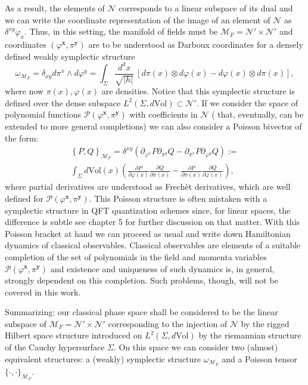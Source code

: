 \documentclass[12pt]{article}%
\begin{document}
As a result, the elements of $\mathcal{N}$ corresponds to a linear subspace of its dual and we can write the coordinate representation of the image of an element of $\mathcal{N}$ as $\delta^{xy}\varphi_x$. Thus, in this setting, the manifold of fields must  be $\mathcal{M}_F=\mathcal{N}'\times \mathcal{N}'$ and coordinates $(\varphi^\mathbf{x},\pi^\mathbf{y})$ are to be understood as Darboux coordinates for a densely defined weakly symplectic structure
\begin{equation}
\label{eq:symplecticFormlifted}
\omega_{\mathcal{M}_F}=\delta_{xy} d\pi^x \wedge d\varphi^y =\int_\Sigma \frac{d^dx}{\sqrt{\lvert h\rvert}}\ [d\pi(x)\otimes d\varphi(x)-d\varphi(x)\otimes d\pi(x)],
\end{equation}
where now $\pi(x),\varphi(x)$ are densities. Notice that this symplectic structure is defined over the dense subspace $L^2(\Sigma,d\textrm{Vol})\subset \mathcal{N}'$. If we consider the space of polynomial functions  $\mathcal{P}(\varphi^\mathbf{x},\pi^\mathbf{y})$ with coefficients in $\mathcal{N}$ ( that, eventually, can be  extended to more general completions) we can also consider a Poisson bivector of the form:
\begin{multline}
\label{eq:poissonbracket}
\left\{P,Q\right\}_{\mathcal{M}_F}=
\delta^{xy}\left( \partial_{\varphi^x}P\partial_{\pi^y}Q-\partial_{\pi^x}P\partial_{\varphi^y}Q \right):=\\
\int_\Sigma d\textrm{Vol}(x)\left( \frac{\partial P}{\partial\varphi(x)}\frac{\partial Q}{\partial\pi(x)}-\frac{\partial P}{\partial\pi(x)}\frac{\partial Q}{\partial\varphi(x)} \right),
\end{multline}
where partial derivatives are understood as Frechèt derivatives, which are well defined for $\mathcal{P}(\varphi^\mathbf{x},\pi^\mathbf{y})$. This Poisson structure is often mistaken with a symplectic structure in QFT quantization schemes since, for linear spaces, the difference is subtle see \cite{Brunetti2015} chapter 5 for further discussion on that matter. With this Poisson bracket at hand we can proceed as usual and write down Hamiltonian dynamics of classical observables.  Classical observables are elements of a suitable completion of the set of polynomials in the field and momenta variables $\mathcal{P}(\varphi^\mathbf{x},\pi^\mathbf{y})$ and existence and uniqueness of such dynamics is, in general, strongly dependent on this completion. Such problems, though, will not be covered in this work.

Summarizing: our classical phase space shall be considered to be the linear subspace of $\mathcal{M}_F=\mathcal{N}'\times \mathcal{N}'$ corresponding to the injection of $\mathcal{N}$ by the rigged Hilbert space structure introduced on $L^2(\Sigma, d\textrm{Vol})$ by the riemannian structure of the Cauchy hypersurface $\Sigma$. On this space we can consider two (almost) equivalent structures: a (weakly) symplectic structure $\omega_{\mathcal{M}_F}$ and a Poisson tensor $\{ \cdot, \cdot \}_{\mathcal{M}_F}$.  
\end{document}
